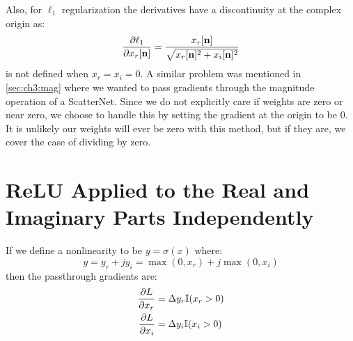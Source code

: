 Also, for $\ell_1$ regularization the derivatives have a discontinuity at the complex
origin as:
\begin{equation}
  \frac{\partial \ell_1}{\partial x_r[\mathbf{n}]} = \frac{x_r[\mathbf{n}]}{\sqrt{x_r[\mathbf{n}]^2 + x_i[\mathbf{n}]^2}}
\end{equation}
is not defined when $x_r=x_i=0$. A similar problem was mentioned in \autoref{sec:ch3:mag}
where we wanted to pass gradients through the magnitude operation of a
ScatterNet. Since we do not explicitly care if weights are zero or near zero, we choose
to handle this by setting the gradient at the origin to be 0. It is unlikely our
weights will ever be zero with this method, but if they are, we cover the case of dividing 
by zero. 

\section{ReLU Applied to the Real and Imaginary Parts Independently}\label{sec:appE:complex_relu}
If we define a nonlinearity to be $y = \sigma(x)$ where:
\begin{equation}
  y = y_r + jy_i = \max(0, x_r) + j\max(0, x_i)
\end{equation}
then the passthrough gradients are:
\begin{align}
  \frac{\partial L}{\partial x_r} &= \Delta y_r \mathbb{I}(x_r > 0)\\
  \frac{\partial L}{\partial x_i} &= \Delta y_i \mathbb{I}(x_i > 0)
\end{align}

